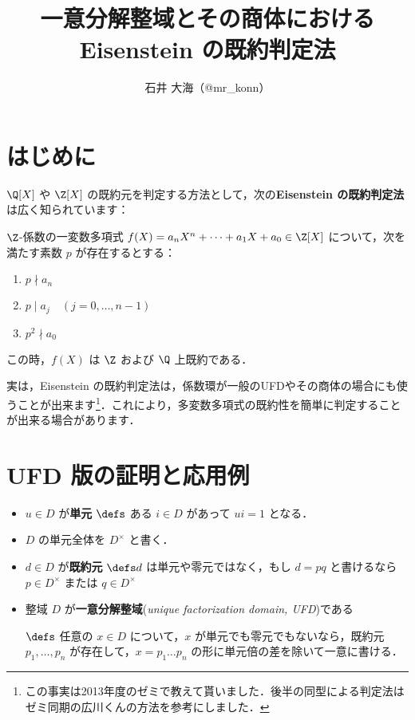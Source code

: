 \documentclass[a4j]{ltjsarticle}
\title{一意分解整域とその商体における Eisenstein の既約判定法}
\author{石井 大海（@mr\_konn）}
\newcommand{\divs}{ \mid }
\begin{document}
\maketitle

\section{はじめに}
$\Q[X]$ や $\Z[X]$ の既約元を判定する方法として，次の{\bfseries Eisenstein の既約判定法}は広く知られています：

\begin{theorem}
 $\Z$-係数の一変数多項式 $f(X) = a_n X^n + \dots + a_1 X + a_0 \in \Z[X]$ について，次を満たす素数 $p$ が存在するとする：

 \begin{enumerate}[label=(\arabic*)]
  \item $p \nmid a_n$
  \item $p \divs a_j \quad (j = 0, \dots, n-1)$
  \item $p^2 \nmid a_0$
 \end{enumerate}

 この時，$f(X)$ は $\Z$ および $\Q$ 上既約である．
\end{theorem}

実は，Eisenstein の既約判定法は，係数環が一般のUFDやその商体の場合にも使うことが出来ます\footnote{この事実は2013年度のゼミで教えて貰いました．後半の同型による判定法はゼミ同期の広川くんの方法を参考にしました．}．これにより，多変数多項式の既約性を簡単に判定することが出来る場合があります．

\section{UFD 版の証明と応用例}

\begin{definition}
 \begin{itemize}
  \item $u \in D$ が{\bfseries 単元} $\defs$ ある $i \in D$ があって $ui = 1$ となる．
  \item $D$ の単元全体を $D^\times$ と書く．
  \item $d \in D$ が{\bfseries 既約元} $\defs d $ は単元や零元ではなく，もし $d = pq$ と書けるなら $p \in D^\times$ または $q \in D^\times$
  \item 整域 $D$ が{\bfseries 一意分解整域}({\itshape unique factorization domain, UFD})である

  $\defs$ 任意の $x \in D$ について，$x$ が単元でも零元でもないなら，既約元 $p_1, \dots, p_n$ が存在して，$x = p_1 \dots p_n$ の形に単元倍の差を除いて一意に書ける．
 \end{itemize}
\end{definition}
\end{document}
